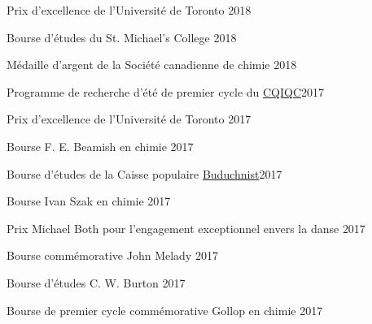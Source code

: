 \documentclass[margin,line]{res}
\begin{document}
\begin{resume}
\vspace*{-3mm}

Prix d'excellence de l'Université de Toronto \href{https://registrar.utoronto.ca/finances-and-funding/utea/}{}\hfill{2018}

\vspace*{-3mm}

Bourse d'études du St. Michael's College \hfill {2018}

\vspace*{-3mm}

Médaille d'argent de la Société canadienne de chimie \href{https://www.cheminst.ca/awards/student/}{} \hfill{2018} 

\vspace*{-3mm}

Programme de recherche d'été de premier cycle du \href{https://cqiqc.physics.utoronto.ca/cqiqc-programs/undergraduates/}{CQIQC}\hfill{2017}

\vspace*{-3mm}

Prix d'excellence de l'Université de Toronto \href{https://registrar.utoronto.ca/finances-and-funding/utea/}{}\hfill{2017}

\vspace*{-3mm}

Bourse F. E. Beamish en chimie \hfill{2017}

\vspace*{-3mm}

Bourse d'études de la Caisse populaire \href{http://www.buduchnist.com/scholarships}{Buduchnist}\hfill {2017}

\vspace*{-3mm}

Bourse Ivan Szak en chimie \hfill {2017}

\vspace*{-3mm}

Prix Michael Both pour l'engagement exceptionnel envers la danse %
\hfill {2017}

\vspace*{-3mm}

Bourse commémorative John Melady \hfill{2017} 

\vspace*{-3mm}

Bourse d'études C. W. Burton \hfill{2017} 

\vspace*{-3mm}

Bourse de premier cycle commémorative Gollop en chimie \hfill{2017}


\end{resume}
\end{document}
